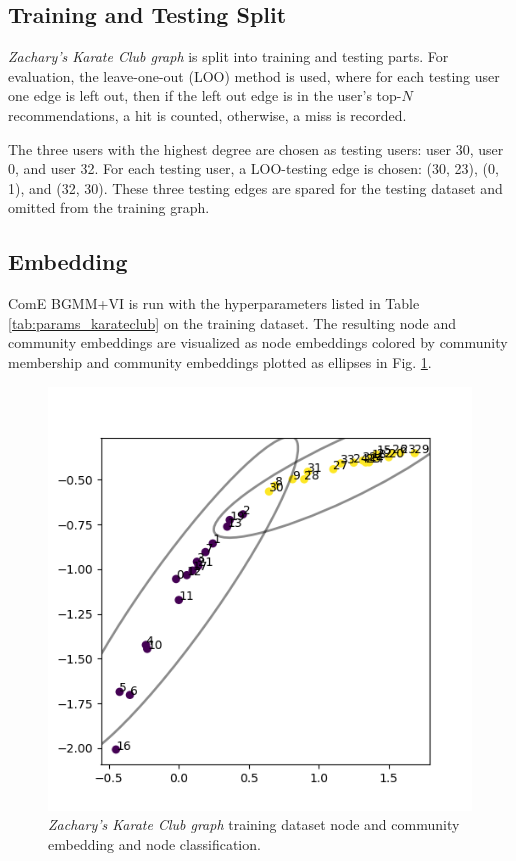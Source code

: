 \documentclass[conference]{IEEEtran}
\begin{document}
\subsection{Training and Testing Split}

\textit{Zachary’s Karate Club graph} is split into training and testing parts. For evaluation, the leave-one-out (LOO) method is used, where for each testing user one edge is left out, then if the left out edge is in the user's top-$N$ recommendations, a hit is counted, otherwise, a miss is recorded.

The three users with the highest degree are chosen as testing users: user 30, user 0, and user 32. For each testing user, a LOO-testing edge is chosen: (30, 23), (0, 1), and (32, 30). These three testing edges are spared for the testing dataset and omitted from the training graph.

\subsection{Embedding}

ComE BGMM+VI is run with the hyperparameters listed in Table \ref{tab:params_karateclub} on the training dataset. The resulting node and community embeddings are visualized as node embeddings colored by community membership and community embeddings plotted as ellipses in Fig. \ref{fig:karateclub_emb}.

\begin{figure}[htbp]
    \centering
    \includegraphics[width=1\linewidth]{images/karateclub/embeddings_5.png}
    \caption{\textit{Zachary’s Karate Club graph} training dataset node and community embedding and node classification.}
    \label{fig:karateclub_emb}
\end{figure}
\end{document}
